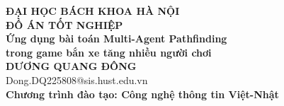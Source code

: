 \documentclass[DoAn.tex]{subfiles}
\begin{document}
\begin{titlepage}
\thispagestyle{empty}
\begin{center}

{\textbf{\large{ĐẠI HỌC BÁCH KHOA HÀ NỘI}}}\\[3cm]

{\textbf{\huge{ĐỒ ÁN TỐT NGHIỆP}}}\\[1cm]
{\textbf{\Large{Ứng dụng bài toán Multi-Agent Pathfinding\\[0.3cm]
trong game bắn xe tăng nhiều người chơi}}}\\[1cm]

{\textbf{\large{DƯƠNG QUANG ĐÔNG}}}\\
{\large{Dong.DQ225808@sis.hust.edu.vn}}\\[0.5cm]

{\textbf{\large{Chương trình đào tạo: Công nghệ thông tin Việt-Nhật}}}\\

\vspace{2cm}

\begin{table}[H]
\centering
{}
\end{table}

\end{center}
\end{titlepage}
\end{document}
